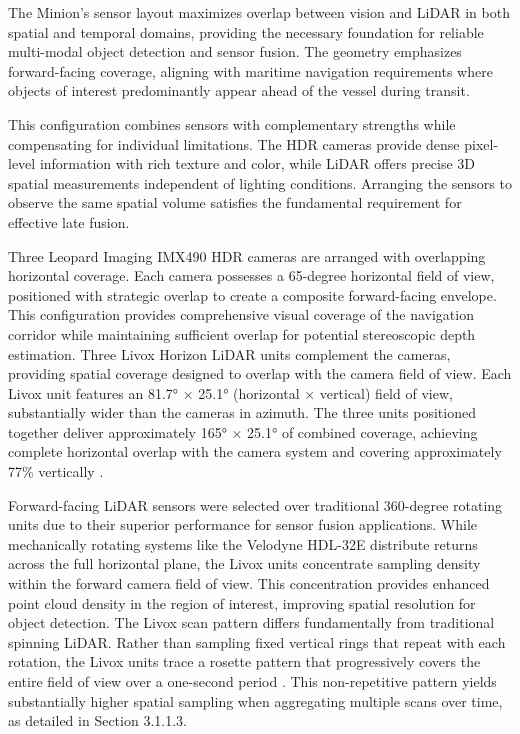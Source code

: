\documentclass{erauthesis}
\begin{document}
The Minion's sensor layout maximizes overlap between vision and \ac{LiDAR} in both spatial and temporal domains, providing the necessary foundation for reliable multi-modal object detection and sensor fusion.
The geometry emphasizes forward-facing coverage, aligning with maritime navigation requirements where objects of interest predominantly appear ahead of the vessel during transit.

This configuration combines sensors with complementary strengths while compensating for individual limitations.
The \ac{HDR} cameras provide dense pixel-level information with rich texture and color, while \ac{LiDAR} offers precise 3D spatial measurements independent of lighting conditions.
Arranging the sensors to observe the same spatial volume satisfies the fundamental requirement for effective late fusion.

Three Leopard Imaging IMX490 \ac{HDR} cameras are arranged with overlapping horizontal coverage.
Each camera possesses a 65-degree horizontal field of view, positioned with strategic overlap to create a composite forward-facing envelope.
This configuration provides comprehensive visual coverage of the navigation corridor while maintaining sufficient overlap for potential stereoscopic depth estimation.
Three Livox Horizon \ac{LiDAR} units complement the cameras, providing spatial coverage designed to overlap with the camera field of view.
Each Livox unit features an 81.7° × 25.1° (horizontal × vertical) field of view, substantially wider than the cameras in azimuth.
The three units positioned together deliver approximately 165° × 25.1° of combined coverage, achieving complete horizontal overlap with the camera system and covering approximately 77\% vertically \cite{thompson2023}.

Forward-facing \ac{LiDAR} sensors were selected over traditional 360-degree rotating units due to their superior performance for sensor fusion applications.
While mechanically rotating systems like the Velodyne HDL-32E distribute returns across the full horizontal plane, the Livox units concentrate sampling density within the forward camera field of view.
This concentration provides enhanced point cloud density in the region of interest, improving spatial resolution for object detection.
The Livox scan pattern differs fundamentally from traditional spinning \ac{LiDAR}.
Rather than sampling fixed vertical rings that repeat with each rotation, the Livox units trace a rosette pattern that progressively covers the entire field of view over a one-second period \cite{thompson2023}.
This non-repetitive pattern yields substantially higher spatial sampling when aggregating multiple scans over time, as detailed in Section 3.1.1.3.
\end{document}
